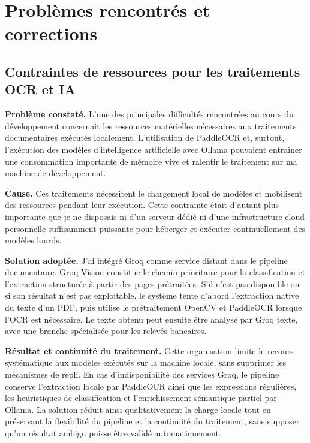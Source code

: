 \documentclass[12pt,a4paper,oneside]{report}
\begin{document}
\section{Problèmes rencontrés et corrections}

\subsection{Contraintes de ressources pour les traitements OCR et IA}

\textbf{Problème constaté.} L'une des principales difficultés rencontrées au
cours du développement concernait les ressources matérielles nécessaires aux
traitements documentaires exécutés localement. L'utilisation de PaddleOCR et,
surtout, l'exécution des modèles d'intelligence artificielle avec Ollama
pouvaient entraîner une consommation importante de mémoire vive et ralentir le
traitement sur ma machine de développement.

\textbf{Cause.} Ces traitements nécessitent le chargement local de modèles et
mobilisent des ressources pendant leur exécution. Cette contrainte était
d'autant plus importante que je ne disposais ni d'un serveur dédié ni d'une
infrastructure cloud personnelle suffisamment puissante pour héberger et
exécuter continuellement des modèles lourds.

\textbf{Solution adoptée.} J'ai intégré Groq comme service distant dans le
pipeline documentaire. Groq Vision constitue le chemin prioritaire pour la
classification et l'extraction structurée à partir des pages prétraitées. S'il
n'est pas disponible ou si son résultat n'est pas exploitable, le système tente
d'abord l'extraction native du texte d'un PDF, puis utilise le prétraitement
OpenCV et PaddleOCR lorsque l'OCR est nécessaire. Le texte obtenu peut ensuite
être analysé par Groq texte, avec une branche spécialisée pour les relevés
bancaires.

\textbf{Résultat et continuité du traitement.} Cette organisation limite le
recours systématique aux modèles exécutés sur la machine locale, sans supprimer
les mécanismes de repli. En cas d'indisponibilité des services Groq, le pipeline
conserve l'extraction locale par PaddleOCR ainsi que les expressions régulières,
les heuristiques de classification et l'enrichissement sémantique partiel par
Ollama. La solution réduit ainsi qualitativement la charge locale tout en
préservant la flexibilité du pipeline et la continuité du traitement, sans
supposer qu'un résultat ambigu puisse être validé automatiquement.
\end{document}
